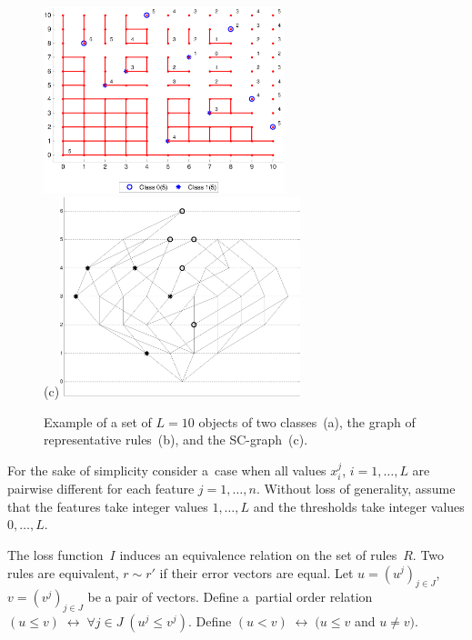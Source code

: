 \documentclass{article}
\renewcommand{\leq}{\leqslant}
\begin{document}
\begin{figure}[t!]
    \noindent\centering
    \includegraphics[width=70mm]{ivahnenko-correctAlgorithm.eps}
    \\
    (c)\includegraphics[width=70mm]{ivahnenko-LinksTree.eps}
    \caption{Example of a set of $L = 10$ objects of two classes~(a),
        the graph of representative rules~(b),
        and the SC-graph~(c).}
    \label{fig:sample10}
\end{figure}

For the sake of simplicity consider a~case when
all values $x_i^j$, $i=1,\ldots,L$ are pairwise different
for each feature $j=1,\ldots,n$.
Without loss of generality, assume that the features take integer values $1,\ldots,L$
and the thresholds take integer values $0,\ldots,L$.

The loss function~$I$ induces an equivalence relation on the set of rules~$R$.
Two rules are equivalent, $r\sim r'$ if their error vectors are equal.
Let
${u=(u^j)_{j\in J}}$, ${v=(v^j)_{j\in J}}$
be a pair of vectors.
Define a~partial order relation
${(u\leq v) \;\leftrightarrow\; \forall j\in J\; (u^j \leq v^j)}$.
Define
${(u < v) \;\leftrightarrow\; (u\leq v}$ and ${u\neq v)}$.
\end{document}
